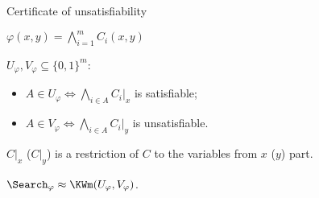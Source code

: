 \begin{frame}{Certificate of unsatisfiability}

    $\varphi(x, y) = \bigwedge\limits_{i = 1}^{m} C_i(x, y)$

    \vspace{0.5cm}

    $U_{\varphi}, V_{\varphi} \subseteq \{0, 1\}^m$:
    \begin{itemize}
        \item $A \in U_{\varphi} \Leftrightarrow \bigwedge\limits_{i \in A} C_i|_{x}$ is satisfiable;
        \item $A \in V_{\varphi} \Leftrightarrow \bigwedge\limits_{i \in A} C_i|_{y}$ is unsatisfiable.
    \end{itemize}

    $C|_{x}$ ($C|_{y}$) is a restriction of $C$ to the variables from $x$ ($y$) part.

    \begin{lemma}
        $\Search_{\varphi} \approx \KWm(U_{\varphi}, V_{\varphi})$.
    \end{lemma}
\end{frame}


